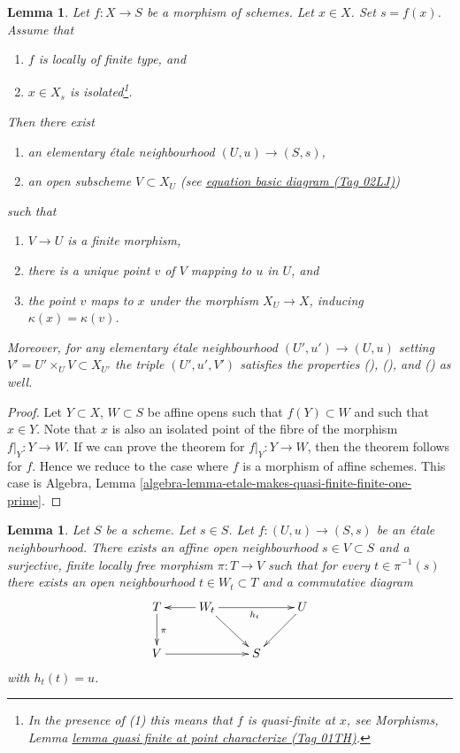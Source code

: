 \documentclass{amsart}
\theoremstyle{plain}
\newtheorem{lemma}[subsection]{Lemma}
\theoremstyle{definition}
\theoremstyle{remark}
\numberwithin{equation}{subsection}
\begin{document}
\begin{lemma}
\label{more-morphisms-lemma-etale-makes-quasi-finite-finite-at-point}
Let $f : X \to S$ be a morphism of schemes.
Let $x \in X$. Set $s = f(x)$.
Assume that
\begin{enumerate}
\item $f$ is locally of finite type, and
\item $x \in X_s$ is isolated\footnote{In the presence of (1)
this means that $f$ is
quasi-finite at $x$, see
Morphisms, Lemma \href{https://stacks.math.columbia.edu/tag/01TH}{lemma quasi finite at point characterize (Tag 01TH)}.}.
\end{enumerate}
Then there exist
\begin{enumerate}
\item[(a)] an elementary \'etale neighbourhood $(U, u) \to (S, s)$,
\item[(b)] an open subscheme $V \subset X_U$
(see \href{https://stacks.math.columbia.edu/tag/02LJ}{equation basic diagram (Tag 02LJ)})
\end{enumerate}
such that
\begin{enumerate}
\item[(\romannumeral1)] $V \to U$ is a finite morphism,
\item[(\romannumeral2)] there is a unique point $v$ of $V$
mapping to $u$ in $U$, and
\item[(\romannumeral3)] the point $v$ maps to $x$
under the morphism $X_U \to X$, inducing $\kappa(x) = \kappa(v)$.
\end{enumerate}
Moreover, for any elementary \'etale neighbourhood $(U', u') \to (U, u)$
setting $V' = U' \times_U V \subset X_{U'}$ the triple $(U', u', V')$
satisfies the properties
(), (), and () as well.
\end{lemma}

\begin{proof}
Let $Y \subset X$, $W \subset S$ be affine opens such that
$f(Y) \subset W$ and such that $x \in Y$. Note that $x$ is
also an isolated point of the fibre of the morphism $f|_Y : Y \to W$.
If we can prove the theorem for $f|_Y : Y \to W$, then the
theorem follows for $f$. Hence we reduce to the case where
$f$ is a morphism of affine schemes. This case is
Algebra, Lemma \ref{algebra-lemma-etale-makes-quasi-finite-finite-one-prime}.
\end{proof}


\begin{lemma}
\label{more-morphisms-lemma-dominate-etale-neighbourhood-finite-flat}
Let $S$ be a scheme. Let $s \in S$.
Let $f : (U, u) \to (S, s)$ be an \'etale neighbourhood.
There exists an affine open neighbourhood $s \in V \subset S$
and a surjective, finite locally free morphism $\pi : T \to V$
such that for every $t \in \pi^{-1}(s)$ there exists an
open neighbourhood $t \in W_t \subset T$ and a commutative
diagram
$$
\xymatrix{
T \ar[d]^\pi & W_t \ar[l] \ar[rr]_{h_t} \ar[rd] & & U \ar[dl] \\
V \ar[rr] & & S
}
$$
with $h_t(t) = u$.
\end{lemma}
\end{document}
